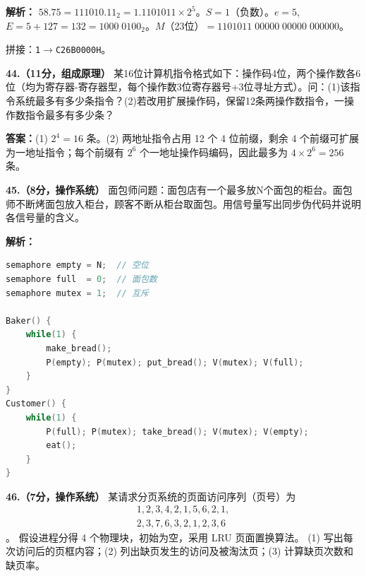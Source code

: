 \ifshowsolutions\par\noindent\textbf{解析：}
$58.75=111010.11_2=1.1101011\times 2^5$。$S=1$（负数）。$e=5$, $E=5+127=132=1000\;0100_2$。$M$（23位）$=1101011\;00000\;00000\;000000$。

拼接：\texttt{1}$\to$\texttt{C26B0000H}。\else \answerarea[8] \fi

\vspace{8pt}

\noindent\textbf{44.（11分，组成原理）} 某16位计算机指令格式如下：操作码4位，两个操作数各6位（均为寄存器-寄存器型，每个操作数3位寄存器号+3位寻址方式）。问：(1)该指令系统最多有多少条指令？(2)若改用扩展操作码，保留12条两操作数指令，一操作数指令最多有多少条？

\ifshowsolutions\par\noindent\textbf{答案：}(1) $2^4=16$ 条。(2) 两地址指令占用 12 个 4 位前缀，剩余 4 个前缀可扩展为一地址指令；每个前缀有 $2^6$ 个一地址操作码编码，因此最多为 $4\times2^6=256$ 条。\else \answerarea[8] \fi

\vspace{8pt}

\noindent\textbf{45.（8分，操作系统）} 面包师问题：面包店有一个最多放N个面包的柜台。面包师不断烤面包放入柜台，顾客不断从柜台取面包。用信号量写出同步伪代码并说明各信号量的含义。

\ifshowsolutions\par\noindent\textbf{解析：}
\begin{lstlisting}[language=C]
semaphore empty = N;  // 空位
semaphore full  = 0;  // 面包数
semaphore mutex = 1;  // 互斥

Baker() {
    while(1) {
        make_bread();
        P(empty); P(mutex); put_bread(); V(mutex); V(full);
    }
}
Customer() {
    while(1) {
        P(full); P(mutex); take_bread(); V(mutex); V(empty);
        eat();
    }
}
\end{lstlisting}\else \answerarea[8] \fi

\vspace{8pt}

\noindent\textbf{46.（7分，操作系统）} 某请求分页系统的页面访问序列（页号）为
\[
\begin{gathered}
1,2,3,4,2,1,5,6,2,1,\\
2,3,7,6,3,2,1,2,3,6
\end{gathered}
\]。
假设进程分得 4 个物理块，初始为空，采用 LRU 页面置换算法。\newline
(1) 写出每次访问后的页框内容；(2) 列出缺页发生的访问及被淘汰页；(3) 计算缺页次数和缺页率。

